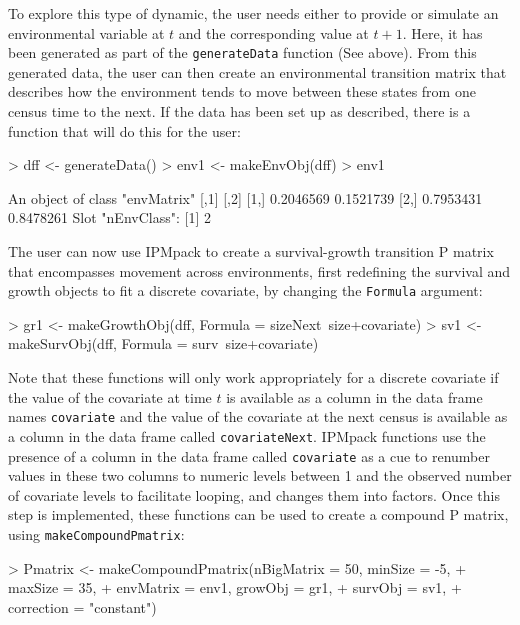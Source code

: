 \documentclass{article}
\begin{document}
To explore this type of dynamic, the user needs  either to provide or simulate
an environmental variable at $t$ and the corresponding value at $t+1$. Here, it
has been generated as part of the {\tt generateData} function (See above). From
this generated data, the user can then create an environmental transition matrix
that describes how the environment tends to move between these states from one
census time to the next. If the data has been set up as described, there is a function that will do this for the user:
\begin{Schunk}
\begin{Sinput}
> dff <- generateData()
> env1 <- makeEnvObj(dff) 
> env1
\end{Sinput}
\begin{Soutput}
An object of class "envMatrix"
          [,1]      [,2]
[1,] 0.2046569 0.1521739
[2,] 0.7953431 0.8478261
Slot "nEnvClass":
[1] 2
\end{Soutput}
\end{Schunk}
The user can now use IPMpack to create a survival-growth transition P matrix that encompasses movement across environments, first redefining the survival and growth
objects to fit a discrete covariate, by changing the {\tt Formula} argument: 
\begin{Schunk}
\begin{Sinput}
> gr1 <- makeGrowthObj(dff, Formula = sizeNext~size+covariate)
> sv1 <- makeSurvObj(dff, Formula = surv~size+covariate)
\end{Sinput}
\end{Schunk}
Note that these functions will only work appropriately for a discrete
covariate if the value of the covariate at time $t$ is available as a
column in the data frame names {\tt covariate} and the value of the
covariate at the next census is available as a column in the data
frame called {\tt covariateNext}. IPMpack functions use the presence
of a column in the data frame called {\tt covariate} as a cue to
renumber values in these two columns to numeric levels between 1 and
the observed number of covariate levels to facilitate looping, and
changes them into factors. Once this step is implemented, these
functions can be used to create a compound P matrix, using {\tt makeCompoundPmatrix}: 
\begin{Schunk}
\begin{Sinput}
> Pmatrix <- makeCompoundPmatrix(nBigMatrix = 50, minSize = -5, 
+                                  maxSize = 35, 
+                                  envMatrix = env1, growObj = gr1, 
+                                  survObj = sv1, 
+                                  correction = "constant")
\end{Sinput}
\end{Schunk}
\end{document}

